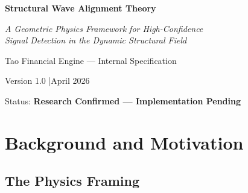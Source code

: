 \documentclass[11pt, a4paper]{article}
\theoremstyle{definition}
\begin{document}
\begin{titlepage}
  \centering
  \vspace*{2cm}
  {\Huge\bfseries Structural Wave Alignment Theory\par}
  \vspace{0.5cm}
  {\large\itshape A Geometric Physics Framework for High-Confidence\\
  Signal Detection in the Dynamic Structural Field\par}
  \vspace{2cm}
  {\large Tao Financial Engine — Internal Specification\par}
  \vspace{0.5cm}
  {\normalsize Version 1.0 \quad|\quad April 2026\par}
  \vspace{0.5cm}
  {\normalsize Status: \textbf{Research Confirmed — Implementation Pending}\par}
  \vspace{3cm}
  \begin{abstract}
    \noindent
    This specification formalises the structural physics underlying high-confidence
    Accumulate signal detection in the Tao Financial Engine Dynamic Structural Field
    (DSF) v3 basin architecture.
    Empirical analysis of 7{,}658 governed trade signals spanning March 2021 to
    March 2026 establishes that three independent structural waves must be
    simultaneously active to reach \(\approx\)85\% signal confidence.
    These waves operate at distinct spatial scales: the individual asset
    (crystallisation event), the asset class (species variability), and the
    broader market (market structural expansion).
    The result is not a statistical filter but a structural attractor state —
    the geometric consequence of wave alignment in the DSF field.
    A fully ordered implementation roadmap is provided.
  \end{abstract}
\end{titlepage}

\tableofcontents
\newpage

\section{Background and Motivation}

\subsection{The Physics Framing}
\end{document}
